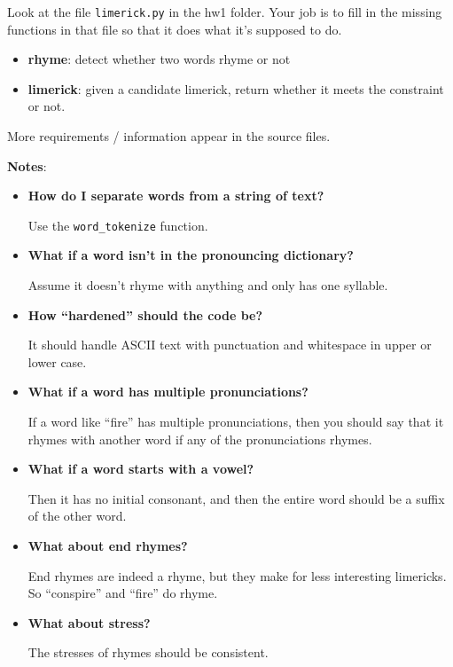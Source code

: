 \documentclass[11pt]{article}
\begin{document}
Look at the file \texttt{limerick.py} in the hw1 folder.  Your job is to fill
in the missing functions in that file so that it does what it’s
supposed to do.
\begin{itemize}
\item {\bf rhyme}: detect whether two words rhyme or not
\item {\bf limerick}: given a candidate limerick, return whether it meets the
constraint or not.
\end{itemize}
More requirements / information appear in the source files.

\clearpage

\noindent \textbf{Notes}:
\begin{itemize}
\item {\bf How do I separate words from a string of text?}

Use the \texttt{word\_tokenize} function.

\item {\bf What if a word isn’t in the pronouncing dictionary?}

Assume it doesn’t rhyme with anything and only has one syllable.

\item {\bf How ``hardened'' should the code be?}

It should handle ASCII text with punctuation and whitespace in upper or lower case.

\item {\bf What if a word has multiple pronunciations?}

If a word like “fire” has multiple pronunciations, then you should say
that it rhymes with another word if any of the pronunciations rhymes.

\item {\bf What if a word starts with a vowel?}

Then it has no initial consonant, and then the entire word should be a
suffix of the other word.


\item {\bf What about end rhymes?}

End rhymes are indeed a rhyme, but they make for less interesting
limericks.  So ``conspire'' and ``fire'' do rhyme.

\item {\bf What about stress?}

The stresses of rhymes should be consistent.

\end{itemize}
\end{document}
